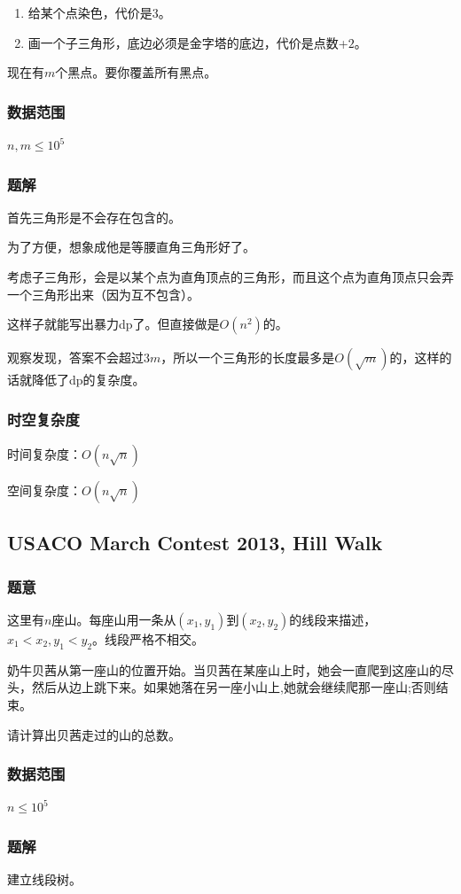 \documentclass{ctexart}
\begin{document}
\begin{enumerate}
\item 给某个点染色，代价是$3$。
\item 画一个子三角形，底边必须是金字塔的底边，代价是点数+$2$。
\end{enumerate}

现在有$m$个黑点。要你覆盖所有黑点。
\subsubsection{数据范围}
$n,m \le 10^5$
\subsubsection{题解}
首先三角形是不会存在包含的。

为了方便，想象成他是等腰直角三角形好了。

考虑子三角形，会是以某个点为直角顶点的三角形，而且这个点为直角顶点只会弄一个三角形出来（因为互不包含）。

这样子就能写出暴力dp了。但直接做是$O(n^2)$的。

观察发现，答案不会超过$3m$，所以一个三角形的长度最多是$O(\sqrt{m})$的，这样的话就降低了dp的复杂度。
\subsubsection{时空复杂度}
时间复杂度：$O(n\sqrt{n})$

空间复杂度：$O(n\sqrt{n})$
\subsection{USACO March Contest 2013, Hill Walk}
\subsubsection{题意}
这里有$n$座山。每座山用一条从$(x_1,y_1)$到$(x_2,y_2)$的线段来描述，$x_1<x_2,y_1<y_2$。线段严格不相交。

奶牛贝茜从第一座山的位置开始。当贝茜在某座山上时，她会一直爬到这座山的尽头，然后从边上跳下来。如果她落在另一座小山上,她就会继续爬那一座山;否则结束。

请计算出贝茜走过的山的总数。
\subsubsection{数据范围}
$n \le 10^5$
\subsubsection{题解}
建立线段树。
\end{document}

